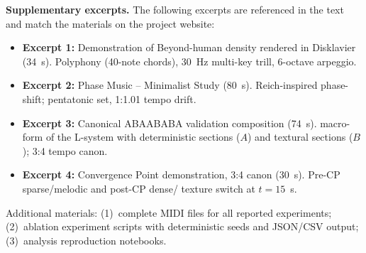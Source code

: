 \documentclass[a4paper]{article}
\theoremstyle{definition}
\theoremstyle{remark}
\begin{document}
\textbf{Supplementary excerpts.} The following excerpts are referenced in the text and match the materials on the project website:
\begin{itemize}
    \item \textbf{Excerpt 1:} Demonstration of Beyond-human density rendered in Disklavier (34~s). Polyphony (40-note chords), 30~Hz multi-key trill, 6-octave arpeggio.
    \item \textbf{Excerpt 2:} Phase Music -- Minimalist Study (80~s). Reich-inspired phase-shift; pentatonic set, 1:1.01 tempo drift.
    \item \textbf{Excerpt 3:} Canonical ABAABABA validation composition (74~s). macro-form of the L-system with deterministic sections ($A$) and textural sections ($B$); 3:4 tempo canon.
    \item \textbf{Excerpt 4:} Convergence Point demonstration, 3:4 canon (30~s). Pre-CP sparse/melodic and post-CP dense/ texture switch at $t = 15$~s.
\end{itemize}

Additional materials: (1)~complete MIDI files for all reported experiments; (2)~ablation experiment scripts with deterministic seeds and JSON/CSV output; (3)~analysis reproduction notebooks.
\end{document}
